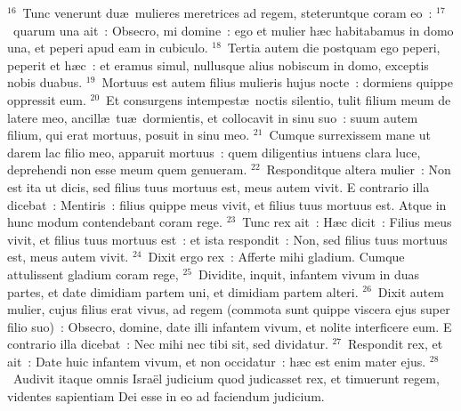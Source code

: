 ${}^{16}$~Tunc venerunt du\ae\ mulieres meretrices ad regem, steteruntque coram eo~:
${}^{17}$~quarum una ait~: Obsecro, mi domine~: ego et mulier h\ae c habitabamus in domo una, et peperi apud eam in cubiculo.
${}^{18}$~Tertia autem die postquam ego peperi, peperit et h\ae c~: et eramus simul, nullusque alius nobiscum in domo, exceptis nobis duabus.
${}^{19}$~Mortuus est autem filius mulieris hujus nocte~: dormiens quippe oppressit eum.
${}^{20}$~Et consurgens intempest\ae\ noctis silentio, tulit filium meum de latere meo, ancill\ae\ tu\ae\ dormientis, et collocavit in sinu suo~: suum autem filium, qui erat mortuus, posuit in sinu meo.
${}^{21}$~Cumque surrexissem mane ut darem lac filio meo, apparuit mortuus~: quem diligentius intuens clara luce, deprehendi non esse meum quem genueram.
${}^{22}$~Responditque altera mulier~: Non est ita ut dicis, sed filius tuus mortuus est, meus autem vivit. E contrario illa dicebat~: Mentiris~: filius quippe meus vivit, et filius tuus mortuus est. Atque in hunc modum contendebant coram rege.
${}^{23}$~Tunc rex ait~: H\ae c dicit~: Filius meus vivit, et filius tuus mortuus est~: et ista respondit~: Non, sed filius tuus mortuus est, meus autem vivit.
${}^{24}$~Dixit ergo rex~: Afferte mihi gladium. Cumque attulissent gladium coram rege,
${}^{25}$~Dividite, inquit, infantem vivum in duas partes, et date dimidiam partem uni, et dimidiam partem alteri.
${}^{26}$~Dixit autem mulier, cujus filius erat vivus, ad regem (commota sunt quippe viscera ejus super filio suo)~: Obsecro, domine, date illi infantem vivum, et nolite interficere eum. E contrario illa dicebat~: Nec mihi nec tibi sit, sed dividatur.
${}^{27}$~Respondit rex, et ait~: Date huic infantem vivum, et non occidatur~: h\ae c est enim mater ejus.
${}^{28}$~Audivit itaque omnis Isra\"el judicium quod judicasset rex, et timuerunt regem, videntes sapientiam Dei esse in eo ad faciendum judicium.

